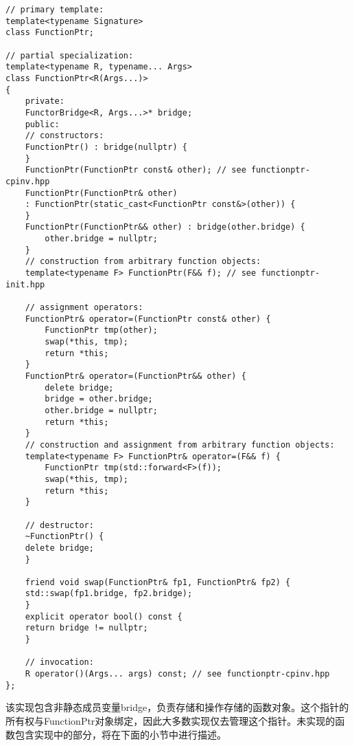 \begin{lstlisting}[style=styleCXX]
// primary template:
template<typename Signature>
class FunctionPtr;

// partial specialization:
template<typename R, typename... Args>
class FunctionPtr<R(Args...)>
{
	private:
	FunctorBridge<R, Args...>* bridge;
	public:
	// constructors:
	FunctionPtr() : bridge(nullptr) {
	}
	FunctionPtr(FunctionPtr const& other); // see functionptr-cpinv.hpp
	FunctionPtr(FunctionPtr& other)
	: FunctionPtr(static_cast<FunctionPtr const&>(other)) {
	}
	FunctionPtr(FunctionPtr&& other) : bridge(other.bridge) {
		other.bridge = nullptr;
	}
	// construction from arbitrary function objects:
	template<typename F> FunctionPtr(F&& f); // see functionptr-init.hpp
	
	// assignment operators:
	FunctionPtr& operator=(FunctionPtr const& other) {
		FunctionPtr tmp(other);
		swap(*this, tmp);
		return *this;
	}
	FunctionPtr& operator=(FunctionPtr&& other) {
		delete bridge;
		bridge = other.bridge;
		other.bridge = nullptr;
		return *this;
	}
	// construction and assignment from arbitrary function objects:
	template<typename F> FunctionPtr& operator=(F&& f) {
		FunctionPtr tmp(std::forward<F>(f));
		swap(*this, tmp);
		return *this;
	}

	// destructor:
	~FunctionPtr() {
	delete bridge;
	}

	friend void swap(FunctionPtr& fp1, FunctionPtr& fp2) {
	std::swap(fp1.bridge, fp2.bridge);
	}
	explicit operator bool() const {
	return bridge != nullptr;
	}

	// invocation:
	R operator()(Args... args) const; // see functionptr-cpinv.hpp
};
\end{lstlisting}

该实现包含非静态成员变量bridge，负责存储和操作存储的函数对象。这个指针的所有权与FunctionPtr对象绑定，因此大多数实现仅去管理这个指针。未实现的函数包含实现中的部分，将在下面的小节中进行描述。






































